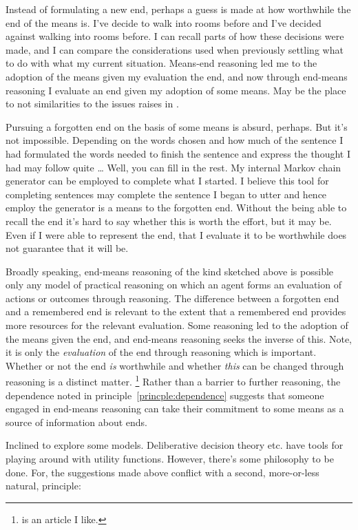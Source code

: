 \documentclass[10pt]{article}
\begin{document}
Instead of formulating a new end, perhaps a guess is made at how worthwhile the end of the means is.
I've decide to walk into rooms before and I've decided against walking into rooms before.
I can recall parts of how these decisions were made, and I can compare the considerations used when previously settling what to do with what my current situation.
Means-end reasoning led me to the adoption of the means given my evaluation the end, and now through end-means reasoning I evaluate an end given my adoption of some means.
{\color{red} May be the place to not similarities to the issues \citeauthor{Paul:2014aa} raises in .}

Pursuing a forgotten end on the basis of some means is absurd, perhaps.
But it's not impossible.
Depending on the words chosen and how much of the sentence I had formulated the words needed to finish the sentence and express the thought I had may follow quite \dots
Well, you can fill in the rest.
My internal Markov chain generator can be employed to complete what I started.
I believe this tool for completing sentences may complete the sentence I began to utter and hence employ the generator is a means to the forgotten end.
Without the being able to recall the end it's hard to say whether this is worth the effort, but it may be.
Even if I were able to represent the end, that I evaluate it to be worthwhile does not guarantee that it will be.

Broadly speaking, end-means reasoning of the kind sketched above is possible only any model of practical reasoning on which an agent forms an evaluation of actions or outcomes through reasoning.
The difference between a forgotten end and a remembered end is relevant to the extent that a remembered end provides more resources for the relevant evaluation.
Some reasoning led to the adoption of the means given the end, and end-means reasoning seeks the inverse of this.
Note, it is only the \emph{evaluation} of the end through reasoning which is important.
Whether or not the end \emph{is} worthwhile and whether \emph{this} can be changed through reasoning is a distinct matter.\nolinebreak
\footnote{\citeauthor{Smith:2004aa} is an article I like.}
Rather than a barrier to further reasoning, the dependence noted in principle~\ref{princple:dependence} suggests that someone engaged in end-means reasoning can take their commitment to some means as a source of information about ends.

Inclined to explore some models.
Deliberative decision theory etc. have tools for playing around with utility functions.
However, there's some philosophy to be done.
For, the suggestions made above conflict with a second, more-or-less natural, principle:
\end{document}
